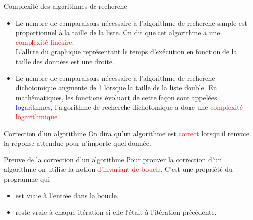 \documentclass[10pt]{beamer}
\begin{document}
\begin{frame}
	\mframe{\NA}
	\begin{block}{Complexité des algorithmes de recherche}
		\begin{itemize}
			\item<2-> Le nombre de comparaisons nécessaire à l'algorithme de recherche simple est proportionnel à la taille de la liste. 
			\onslide<3->On dit que cet algorithme a une \textcolor{red}{complexité linéaire}.\\
			\onslide<4->L'allure du graphique représentant le temps d'exécution en fonction de la taille des données est une droite.
			\item<5-> Le nombre de comparaisons nécessaire à l'algorithme de recherche dichotomique augmente de 1 lorsque la taille de la liste double.
			\onslide<6-> En mathématiques, les fonctions évoluant de cette façon sont appelées \textcolor{blue}{logarithmes}, l'algorithme de recherche dichotomique a donc une \textcolor{red}{complexité logarithmique}
		\end{itemize}
	\end{block}	
\end{frame}

\begin{frame}
	\mframe{\NA}
	\begin{alertblock}{Correction d'un algorithme}
		On dira qu'un algorithme est \textcolor{red}{correct}
		\onslide<2-> lorsqu'il renvoie la réponse attendue pour n'importe quel donnée.
	\end{alertblock}
\end{frame}

\begin{frame}
	\mframe{\NA}
	\begin{alertblock}{Preuve de la correction d'un algorithme}
		Pour prouver la correction d'un algorithme on utilise la notion \textcolor{red}{d'invariant de boucle}. C'est une propriété du programme qui
		\begin{itemize}
			\item<2-> est vraie à l'entrée dans la boucle.
			\item<3-> reste vraie à chaque itération si elle l'était à l'itération précédente.
		\end{itemize}
	\end{alertblock}
\end{frame}
\end{document}

